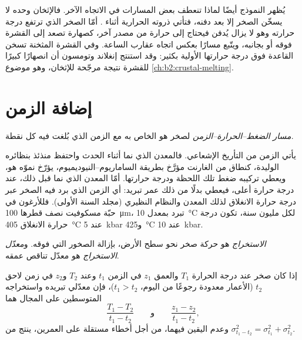 يُظهر النموذج أيضًا لماذا تنعطف بعض المسارات في الاتجاه الآخر. فالإثخان وحده لا يسخّن الصخر
إلا بعد دفنه، فتأتي ذروته الحرارية أثناء . أمّا الصخر الذي
ترتفع درجة حرارته وهو لا يزال يُدفن فيحتاج إلى حرارة من مصدر آخر، كصهارة
تصعد إلى القشرة فوقه أو بجانبه، ويتّبع مسارًا بعكس اتجاه عقارب الساعة. وفي
القشرة المثخنة تسخن القاعدة فوق درجة حرارتها الأولية بكثير: وقد استنتج إنغلاند وتومسون
أن انصهارًا كبيرًا للقشرة نتيجة مرجّحة للإثخان،
وهو موضوع \cref{ch:b2:crustal-melting}.

\section{إضافة الزمن}\label{sec:b2:pt-paths:time}

\begin{definition}\label{def:b2:pt-paths:ptt}
\emph{مسار الضغط--الحرارة--الزمن} لصخر هو  الخاص به مع الزمن الذي
بُلغت فيه كل نقطة.
\end{definition}

يأتي الزمن من التأريخ الإشعاعي. فالمعدن الذي نما أثناء الحدث واحتفظ منذئذ
بنظائره الوليدة، كنطاق من الغارنت مؤرَّخ بطريقة
الساماريوم--النيوديميوم، يؤرّخ نموّه هو، ويعطي
تركيبه ضغط تلك اللحظة ودرجة حرارتها. أمّا المعدن الذي نما
قبل ذلك، عند درجة حرارة أعلى، فيعطي بدلًا من ذلك عمر تبريد: أي الزمن الذي برد فيه الصخر
عبر درجة حرارة الانغلاق لذلك المعدن والنظام النظيري (مجلد السنة
الأولى). فللأرغون في حبّة مسكوفيت نصف قطرها \qty{100}{\micro m}، تبرد بمعدل
\qty{10}{\celsius} لكل مليون سنة، تكون درجة حرارة الانغلاق \qty{405}{\celsius} عند
\qty{5}{kbar} و\qty{425}{\celsius} عند \qty{10}{kbar}.

\begin{definition}\label{def:b2:pt-paths:exhumation}
\emph{الاستخراج} هو حركة صخر نحو سطح الأرض،
بإزالة الصخور التي فوقه. و\emph{معدّل الاستخراج} هو
معدّل تناقص عمقه.
\end{definition}

\begin{proposition}\label{prop:b2:pt-paths:rates}
إذا كان صخر عند درجة الحرارة $T_1$ والعمق $z_1$ في الزمن $t_1$ وعند $T_2$ و$z_2$ في
زمن لاحق $t_2$ (الأعمار معدودة رجوعًا من اليوم، $t_1 > t_2$)، فإن معدّلي تبريده
واستخراجه المتوسطين على المجال هما
\[
\frac{T_1 - T_2}{t_1 - t_2}
\qquad\text{و}\qquad
\frac{z_1 - z_2}{t_1 - t_2},
\]
وعدم اليقين فيهما، من أجل أخطاء مستقلة على العمرين، ينتج من
$\sigma_{t_1 - t_2}^2 = \sigma_{t_1}^2 + \sigma_{t_2}^2$.
\end{proposition}

